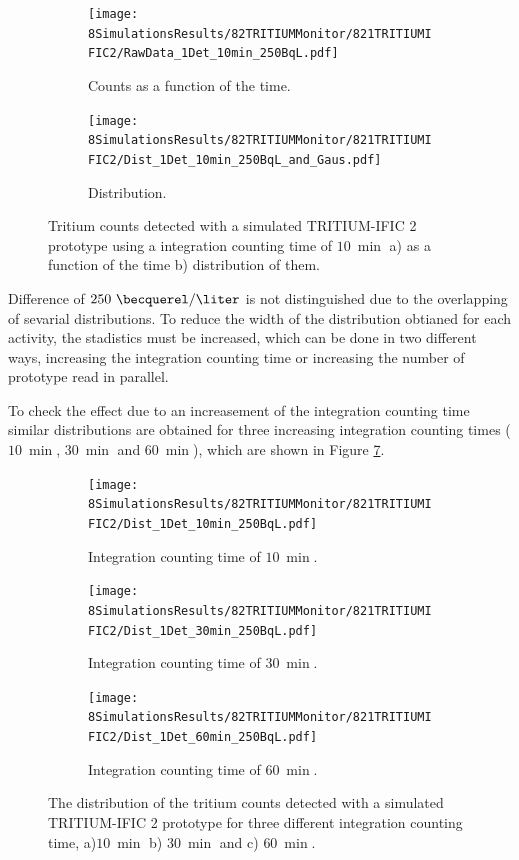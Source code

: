 \begin{figure}
\centering
    \begin{subfigure}[b]{0.7\textwidth}
    \centering
    \texttt{[image: 8SimulationsResults/82TRITIUMMonitor/821TRITIUMIFIC2/RawData\_1Det\_10min\_250BqL.pdf]}  
    \caption{Counts as a function of the time.\label{subfig:RawData1Det10Min250BqL}}
    \end{subfigure}
    \hfill
    \begin{subfigure}[b]{0.7\textwidth}
    \centering
    \texttt{[image: 8SimulationsResults/82TRITIUMMonitor/821TRITIUMIFIC2/Dist\_1Det\_10min\_250BqL\_and\_Gaus.pdf]}  
    \caption{Distribution.\label{subfig:Dist1Det10Min250BqL}}
    \end{subfigure}
 \caption{Tritium counts detected with a simulated TRITIUM-IFIC 2 prototype using a integration counting time of $10~\min$ a) as a function of the time b) distribution of them.}
 \label{fig:1Det10Min250BqL}
\end{figure}

Difference of $250~\becquerel/\liter$ is not distinguished due to the overlapping of sevarial distributions. To reduce the width of the distribution obtianed for each activity, the stadistics must be increased, which can be done in two different ways, increasing the integration counting time or increasing the number of prototype read in parallel.

To check the effect due to an increasement of the integration counting time similar distributions are obtained for three increasing integration counting times ($10~\min$, $30~\min$ and $60~\min$), which are shown in Figure \ref{fig:1Det250BqLseveralTimes}. 

\begin{figure}
\centering
    \begin{subfigure}[b]{0.6\textwidth}
    \centering
    \texttt{[image: 8SimulationsResults/82TRITIUMMonitor/821TRITIUMIFIC2/Dist\_1Det\_10min\_250BqL.pdf]}  
    \caption{Integration counting time of $10~\min$.\label{subfig:1Det10min250BqLST}}
    \end{subfigure}
    \hfill
    \begin{subfigure}[b]{0.6\textwidth}
    \centering
    \texttt{[image: 8SimulationsResults/82TRITIUMMonitor/821TRITIUMIFIC2/Dist\_1Det\_30min\_250BqL.pdf]}  
    \caption{Integration counting time of $30~\min$.\label{subfig:1Det30min250BqLST}}
    \end{subfigure}
    \hfill
    \begin{subfigure}[b]{0.6\textwidth}
    \centering
    \texttt{[image: 8SimulationsResults/82TRITIUMMonitor/821TRITIUMIFIC2/Dist\_1Det\_60min\_250BqL.pdf]}  
    \caption{Integration counting time of $60~\min$.\label{subfig:1Det60min250BqLST}}
    \end{subfigure}
 \caption{The distribution of the tritium counts detected with a simulated TRITIUM-IFIC 2 prototype for three different integration counting time, a)$10~\min$ b) $30~\min$ and c) $60~\min$.}
 \label{fig:1Det250BqLseveralTimes}
\end{figure}

